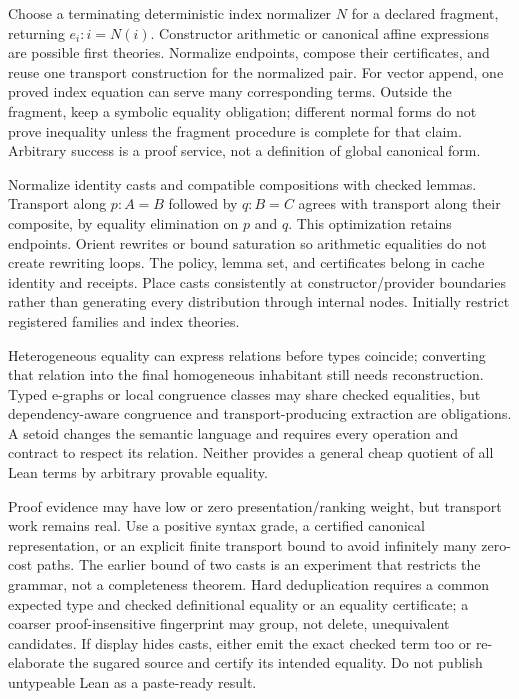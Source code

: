 Choose a terminating deterministic index normalizer $N$ for a declared
fragment, returning $e_i:i=N(i)$. Constructor arithmetic or canonical affine
expressions are possible first theories. Normalize endpoints, compose their
certificates, and reuse one transport construction for the normalized pair.
For vector append, one proved index equation can serve many corresponding
terms. Outside the fragment, keep a symbolic equality obligation; different
normal forms do not prove inequality unless the fragment procedure is complete
for that claim. Arbitrary  success is a proof service, not a definition
of global canonical form.

Normalize identity casts and compatible compositions with checked lemmas.
Transport along $p:A=B$ followed by $q:B=C$ agrees with transport along their
composite, by equality elimination on $p$ and $q$. This optimization retains
endpoints. Orient rewrites or bound saturation so arithmetic equalities do not
create rewriting loops. The policy, lemma set, and certificates belong in
cache identity and receipts. Place casts consistently at constructor/provider
boundaries rather than generating every distribution through internal nodes.
Initially restrict registered families and index theories.

Heterogeneous equality can express relations before types coincide; converting
that relation into the final homogeneous inhabitant still needs reconstruction.
Typed e-graphs or local congruence classes may share checked equalities, but
dependency-aware congruence and transport-producing extraction are obligations.
A setoid changes the semantic language and requires every operation and
contract to respect its relation. Neither provides a general cheap quotient of
all Lean terms by arbitrary provable equality.

Proof evidence may have low or zero presentation/ranking weight, but transport
work remains real. Use a positive syntax grade, a certified canonical
representation, or an explicit finite transport bound to avoid infinitely
many zero-cost paths. The earlier bound of two casts is an experiment that
restricts the grammar, not a completeness theorem. Hard deduplication requires
a common expected type and checked definitional equality or an equality
certificate; a coarser proof-insensitive fingerprint may group, not delete,
unequivalent candidates. If display hides casts, either emit the exact checked
term too or re-elaborate the sugared source and certify its intended equality.
Do not publish untypeable Lean as a paste-ready result.

